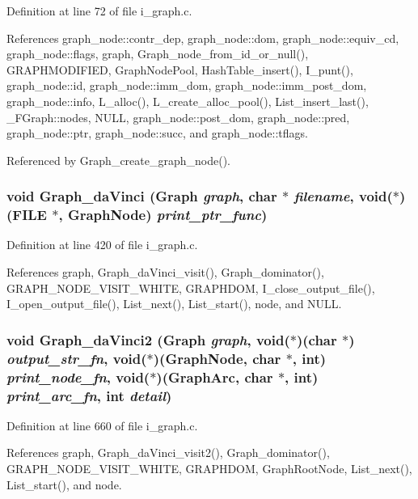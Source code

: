 Definition at line 72 of file i\_\-graph.c.

References graph\_\-node::contr\_\-dep, graph\_\-node::dom, graph\_\-node::equiv\_\-cd, graph\_\-node::flags, graph, Graph\_\-node\_\-from\_\-id\_\-or\_\-null(), GRAPHMODIFIED, Graph\-Node\-Pool, Hash\-Table\_\-insert(), I\_\-punt(), graph\_\-node::id, graph\_\-node::imm\_\-dom, graph\_\-node::imm\_\-post\_\-dom, graph\_\-node::info, L\_\-alloc(), L\_\-create\_\-alloc\_\-pool(), List\_\-insert\_\-last(), \_\-FGraph::nodes, NULL, graph\_\-node::post\_\-dom, graph\_\-node::pred, graph\_\-node::ptr, graph\_\-node::succ, and graph\_\-node::tflags.

Referenced by Graph\_\-create\_\-graph\_\-node().
\subsubsection{\setlength{\rightskip}{0pt plus 5cm}void Graph\_\-da\-Vinci (\bf{Graph} {\em graph}, char $\ast$ {\em filename}, void($\ast$)(FILE $\ast$, \bf{Graph\-Node}) {\em print\_\-ptr\_\-func})}\label{i__graph_8c_277dd7e82e82f10d773e9443f2ddb02b}




Definition at line 420 of file i\_\-graph.c.

References graph, Graph\_\-da\-Vinci\_\-visit(), Graph\_\-dominator(), GRAPH\_\-NODE\_\-VISIT\_\-WHITE, GRAPHDOM, I\_\-close\_\-output\_\-file(), I\_\-open\_\-output\_\-file(), List\_\-next(), List\_\-start(), node, and NULL.
\subsubsection{\setlength{\rightskip}{0pt plus 5cm}void Graph\_\-da\-Vinci2 (\bf{Graph} {\em graph}, void($\ast$)(char $\ast$) {\em output\_\-str\_\-fn}, void($\ast$)(\bf{Graph\-Node}, char $\ast$, int) {\em print\_\-node\_\-fn}, void($\ast$)(\bf{Graph\-Arc}, char $\ast$, int) {\em print\_\-arc\_\-fn}, int {\em detail})}\label{i__graph_8c_37f3918ed44badf5cc092022b88cecd8}




Definition at line 660 of file i\_\-graph.c.

References graph, Graph\_\-da\-Vinci\_\-visit2(), Graph\_\-dominator(), GRAPH\_\-NODE\_\-VISIT\_\-WHITE, GRAPHDOM, Graph\-Root\-Node, List\_\-next(), List\_\-start(), and node.

